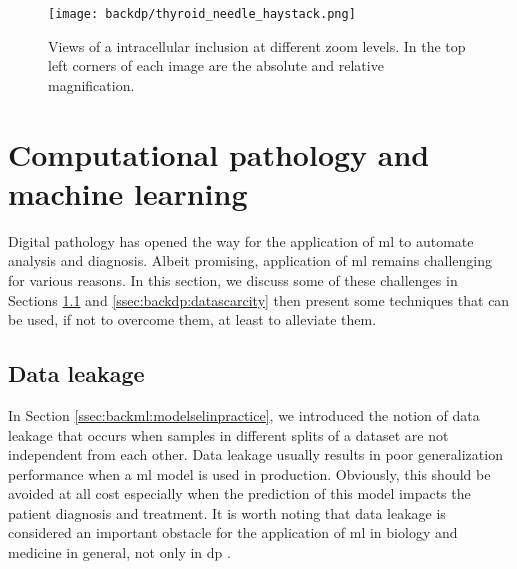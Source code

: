 \begin{figure}
  \centering
  \texttt{[image: backdp/thyroid\_needle\_haystack.png]}
  \caption{Views of a intracellular inclusion at different zoom levels. In the top left corners of each image are the absolute and relative magnification.}
  \label{fig:backdp:thyroid_needle_haystack}
\end{figure}





\section{Computational pathology and machine learning}
\label{sec:backdp:ml}

Digital pathology has opened the way for the application of \acrlong{ml} to automate analysis and diagnosis. Albeit promising, application of \acrlong{ml} remains challenging for various reasons. In this section, we discuss some of these challenges in Sections \ref{ssec:backdp:dataleakage} and \ref{ssec:backdp:datascarcity} then present some techniques that can be used, if not to overcome them, at least to alleviate them.

\subsection{Data leakage}
\label{ssec:backdp:dataleakage}

In Section \ref{ssec:backml:modelselinpractice}, we introduced the notion of data leakage that occurs when samples in different splits of a dataset are not independent from each other. Data leakage usually results in poor generalization performance when a \acrlong{ml} model is used in production. Obviously, this should be avoided at all cost especially when the prediction of this model impacts the patient diagnosis and treatment. It is worth noting that data leakage is considered an important obstacle for the application of \acrlong{ml} in biology and medicine in general, not only in \acrlong{dp} \parencite{ching2018opportunities}. 

